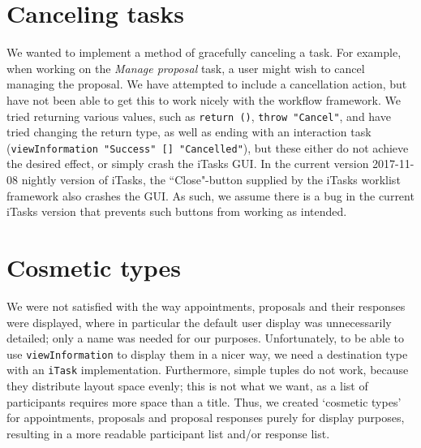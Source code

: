 \documentclass{article}
\begin{document}
    \section{Canceling tasks}
	We wanted to implement a method of gracefully canceling a task.
	For example, when working on the \emph{Manage proposal} task, a user might wish to cancel managing the proposal.
	We have attempted to include a cancellation action, but have not been able to get this to work nicely with the workflow framework.
	We tried returning various values, such as \lstinline|return ()|, \lstinline|throw "Cancel"|, and have tried changing the return type, as well as ending with an interaction task (\lstinline|viewInformation "Success" [] "Cancelled"|), but these either do not achieve the desired effect, or simply crash the iTasks GUI.
	In the current version 2017-11-08 nightly version of iTasks, the ``Close"-button supplied by the iTasks worklist framework also crashes the GUI.
	As such, we assume there is a bug in the current iTasks version that prevents such buttons from working as intended.
    
    \section{Cosmetic types}
	We were not satisfied with the way appointments, proposals and their responses were displayed, where in particular the default user display was unnecessarily detailed; only a name was needed for our purposes.
    Unfortunately, to be able to use \lstinline|viewInformation| to display them in a nicer way, we need a destination type with an \lstinline|iTask| implementation.
    Furthermore, simple tuples do not work, because they distribute layout space evenly; this is not what we want, as a list of participants requires more space than a title.
    Thus, we created `cosmetic types' for appointments, proposals and proposal responses purely for display purposes, resulting in a more readable participant list and/or response list.
    
\end{document}
